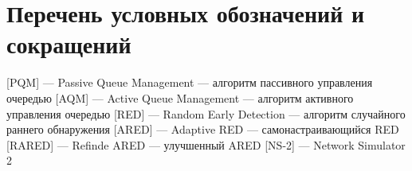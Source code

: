 
\label{abbrv}
\chapter*{Перечень условных обозначений и сокращений}


\begin{acronym}
        [PQM]{ --- Passive Queue Management --- алгоритм пассивного управления очередью}
        [AQM]{ --- Active Queue Management --- алгоритм активного управления очередью}
        [RED]{ --- Random Early Detection --- алгоритм случайного раннего обнаружения}
        [ARED]{ --- Adaptive RED --- самонастраивающийся RED}
        [RARED]{ --- Refinde ARED --- улучшенный ARED}
        [NS-2]{ --- Network Simulator 2}
\end{acronym}


\newpage
